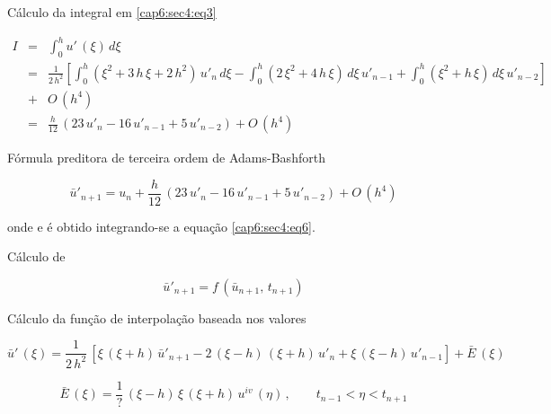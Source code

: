 \begin{enumerar}
\item Cálculo da integral em \ref{cap6:sec4:eq3}

\begin{eqnarray}
 I & = & \int^h_0 u' \, (\xi) \, d\xi \nonumber \\
   & = & \frac{1}{2 \, h^2} \left[ \int_0^h (\xi^2 + 3 \, h \, \xi + 2 \, h^2) \, u'_n \, d\xi - \int^h_0 (2 \, \xi^2 + 4 \, h \, \xi) \, d\xi \, u'_{n-1} + \int^h_0 (\xi^2 + h \, \xi) \, d\xi \, u'_{n-2} \right] \nonumber \\
   & + & O \, (h^4) \nonumber \\
   \label{cap6:sec4:eq7}
   & = & \frac{h}{12} \, (23 \, u'_n - 16 \, u'_{n-1} + 5 \, u'_{n-2}) + O \, (h^4)
\end{eqnarray}

\item Fórmula preditora de terceira ordem de Adams-Bashforth

\begin{equation}
 \label{cap6:sec4:eq8}
 \bar{u}'_{n+1} = u_n + \frac{h}{12} \, (23 \, u'_n - 16 \, u'_{n-1} + 5 \, u'_{n-2}) + O \, (h^4)
\end{equation}

onde  e  é obtido integrando-se a equação \ref{cap6:sec4:eq6}.

\item Cálculo de 

\begin{equation}
 \label{cap6:sec4:eq9}
 \bar{u}'_{n+1} = f \, (\bar{u}_{n+1}, \, t_{n+1})
\end{equation}

\item Cálculo da função de interpolação  baseada nos valores 

\begin{equation}
 \label{cap6:sec4:eq10}
 \bar{u}' \, (\xi) = \frac{1}{2 \, h^2} \, \left[\xi \, (\xi + h) \, \bar{u}'_{n+1} - 2 \, (\xi - h) \, (\xi + h) \, u'_n + \xi \, (\xi - h) \, u'_{n-1} \right] + \bar{E} \, (\xi)
\end{equation}

\begin{equation}
 \label{cap6:sec4:eq11}
 \bar{E} \, (\xi) = \frac{1}{?} \, (\xi - h) \, \xi \, (\xi + h) \, u^{iv} \, (\eta) \, , \qquad t_{n-1} < \eta < t_{n+1}
\end{equation}


\end{enumerar}
